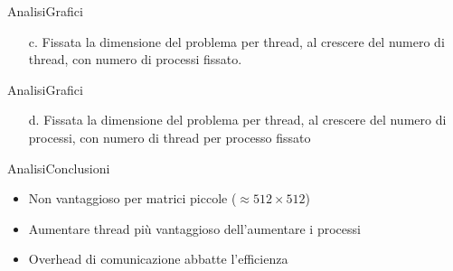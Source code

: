 \begin{frame}{Analisi}{Grafici}
    \begin{enumerate}
        \item[c.] Fissata la dimensione del problema per thread, al crescere del numero di thread, con numero di processi fissato.
    \end{enumerate}
\end{frame}

\begin{frame}{Analisi}{Grafici}
    \begin{enumerate}
        \item[d.] Fissata la dimensione del problema per thread, al crescere del numero di processi, con numero di thread per processo fissato
    \end{enumerate}
\end{frame}

\begin{frame}{Analisi}{Conclusioni}
    \begin{itemize}
        \item Non vantaggioso per matrici piccole ($\approx 512 \times 512$)
        \item Aumentare thread più vantaggioso dell'aumentare i processi
        \item Overhead di comunicazione abbatte l'efficienza
    \end{itemize}
\end{frame}